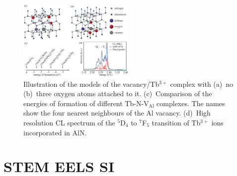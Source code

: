 \documentclass[%
aip,
rsi,%
 amsmath,amssymb,%
 reprint,%
]{revtex4-1}
\begin{document}
\begin{figure}%
	\includegraphics[width=0.5\textwidth]{model}
    \caption{Illustration of the models of the vacancy/Tb$^{3+}$ complex with (a)~no (b)~three oxygen atoms attached to it. (c)~Comparison of the energies of formation of different Tb-N-V$_\text{Al}$ complexes. The names show the four nearest neighbours of the Al vacancy. (d)~High resolution CL spectrum of the $^5$D$_4$ to $^7$F$_5$ transition of Tb$^{3+}$ ions incorporated in AlN.}
    \label{fig:felix_model}
\end{figure}

\section{STEM EELS SI}
\label{sec:STEMEELSSI}
\end{document}
